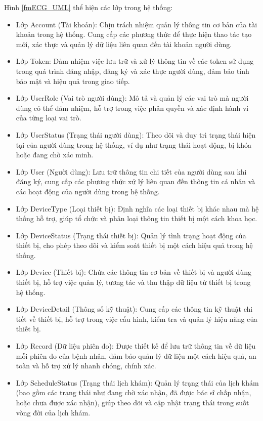 Hình \ref*{fmECG_UML} thể hiện các lớp trong hệ thống:
\begin{itemize}
	\item Lớp Account (Tài khoản): Chịu trách nhiệm quản lý thông tin cơ bản của tài khoản trong hệ thống. Cung cấp các phương thức để thực hiện thao tác tạo mới, xác thực và quản lý dữ liệu liên quan đến tài khoản người dùng.
	\item Lớp Token: Đảm nhiệm việc lưu trữ và xử lý thông tin về các token sử dụng trong quá trình đăng nhập, đăng ký và xác thực người dùng, đảm bảo tính bảo mật và hiệu quả trong giao tiếp.
	\item Lớp UserRole (Vai trò người dùng): Mô tả và quản lý các vai trò mà người dùng có thể đảm nhiệm, hỗ trợ trong việc phân quyền và xác định hành vi của từng loại vai trò.
	\item Lớp UserStatus (Trạng thái người dùng): Theo dõi và duy trì trạng thái hiện tại của người dùng trong hệ thống, ví dụ như trạng thái hoạt động, bị khóa hoặc đang chờ xác minh.
	\item Lớp User (Người dùng): Lưu trữ thông tin chi tiết của người dùng sau khi đăng ký, cung cấp các phương thức xử lý liên quan đến thông tin cá nhân và các hoạt động của người dùng trong hệ thống.
	\item Lớp DeviceType (Loại thiết bị): Định nghĩa các loại thiết bị khác nhau mà hệ thống hỗ trợ, giúp tổ chức và phân loại thông tin thiết bị một cách khoa học.
	\item Lớp DeviceStatus (Trạng thái thiết bị): Quản lý tình trạng hoạt động của thiết bị, cho phép theo dõi và kiểm soát thiết bị một cách hiệu quả trong hệ thống.
	\item Lớp Device (Thiết bị): Chứa các thông tin cơ bản về thiết bị và người dùng thiết bị, hỗ trợ việc quản lý, tương tác và thu thập dữ liệu từ thiết bị trong hệ thống.
	\item Lớp DeviceDetail (Thông số kỹ thuật): Cung cấp các thông tin kỹ thuật chi tiết về thiết bị, hỗ trợ trong việc cấu hình, kiểm tra và quản lý hiệu năng của thiết bị.
	\item Lớp Record (Dữ liệu phiên đo): Được thiết kế để lưu trữ thông tin về dữ liệu mỗi phiên đo của bệnh nhân, đảm bảo quản lý dữ liệu một cách hiệu quả, an toàn và hỗ trợ xử lý nhanh chóng, chính xác.
	\item Lớp ScheduleStatus (Trạng thái lịch khám): Quản lý trạng thái của lịch khám (bao gồm các trạng thái như đang chờ xác nhận, đã được bác sĩ chấp nhận, hoặc chưa được xác nhận), giúp theo dõi và cập nhật trạng thái trong suốt vòng đời của lịch khám.

\end{itemize}
